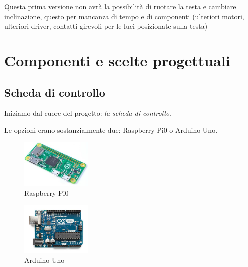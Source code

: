 \documentclass[12pt]{article}
\newcommand{\imgsz}{0.3\textwidth}
\begin{document}
Questa prima versione non avrà la possibilità di ruotare la testa e cambiare inclinazione, questo per mancanza di tempo e di componenti (ulteriori motori, ulteriori driver, contatti girevoli per le luci posizionate sulla testa)
 
\section{Componenti e scelte progettuali}
\subsection{Scheda di controllo}
Iniziamo dal cuore del progetto: \emph{la scheda di controllo}.

Le opzioni erano sostanzialmente due: Raspberry Pi0 o Arduino Uno.

\begin{figure}[h]
\includegraphics[width=\imgsz]{rpi0}
\centering
\caption{Raspberry Pi0}
\label{fig:rpi0}
\end{figure}

\begin{figure}[h]
\includegraphics[width=\imgsz]{Uno}
\centering
\caption{Arduino Uno}
\label{fig:uno}
\end{figure}
\end{document}
